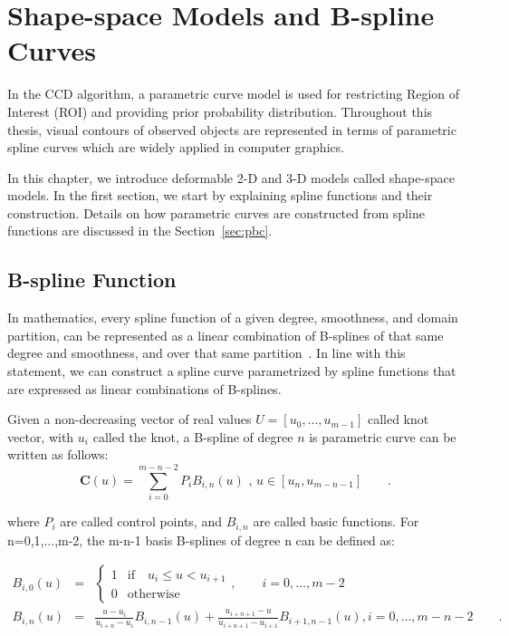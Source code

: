 \chapter{Shape-space Models and B-spline Curves}
\label{chapter:bspline}
In the CCD algorithm, a parametric curve model is used for
restricting Region of Interest (ROI) and providing prior probability distribution. 
Throughout this thesis, visual contours of observed objects are represented in terms of
parametric spline curves which are widely applied in computer graphics.

In this chapter, we introduce deformable 2-D and 3-D models called
shape-space models.  In the first section, we start by explaining
spline functions and their construction. Details on how parametric
curves are constructed from spline functions are discussed in the
Section~\ref{sec:pbc}. %
\section{B-spline Function}
\label{sec:bsc}
In mathematics, every spline function of a given degree,
smoothness, and domain partition, can be represented as a linear
combination of B-splines of that same degree and smoothness, and over
that same partition~\cite{press2007numerical}. In line with this statement, we can
construct  a spline curve parametrized by spline functions that are
expressed as linear combinations of B-splines. 

Given a non-decreasing vector of real values $U = [u_0, \ldots,
u_{m-1}]$ called knot vector, with $u_i$ called the knot, a
B-spline of degree $n$ is parametric curve can be written as follows:
\begin{equation}
  \label{eq:4.1}
  \mathbf{C}(u) =  \sum_{i=0}^{m-n-2} P_{i} B_{i,n}(u) \mbox{ , } u \in [u_{n},u_{m-n-1}]\qquad.
\end{equation}

where $P_i$ are called control points, and $B_{i,n}$ are called
basic functions. For n=0,1,...,m-2, the m-n-1 basis B-splines of degree
n can be defined as:

\begin{eqnarray}
  \label{eq:4.2}
  B_{i,0}(u) &=&  \left\{
\begin{matrix} 
1 & \mathrm{if} \quad u_i \leq u < u_{i+1} \\
0 & \mathrm{otherwise}
\end{matrix}
\right.,\qquad i=0,\ldots, m{-}2 \\
B_{i,n}(u) &=& \frac{u - u_i}{u_{i+n} - u_i} B_{i,n-1}(u) + \frac{u_{i+n+1} - u}{u_{i+n+1} - u_{i+1}} B_{i+1,n-1}(u)
, i=0,\ldots, m{-}n{-}2 \qquad.
\end{eqnarray}

